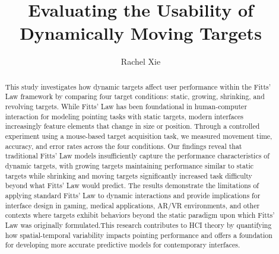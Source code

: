 \documentclass[acmlarge]{acmart}
\begin{document}
\title{Evaluating the Usability of Dynamically Moving Targets}

\author{Rachel Xie}
\authornotemark[1]

\renewcommand{\shortauthors}{Trovato et al.}

\begin{abstract}
 This study investigates how dynamic targets affect user performance within the Fitts' Law framework by comparing four target conditions: static, growing, shrinking, and revolving targets. While Fitts' Law has been foundational in human-computer interaction for modeling pointing tasks with static targets, modern interfaces increasingly feature elements that change in size or position. Through a controlled experiment using a mouse-based target acquisition task, we measured movement time, accuracy, and error rates across the four conditions. Our findings reveal that traditional Fitts' Law models insufficiently capture the performance characteristics of dynamic targets, with growing targets maintaining performance similar to static targets while shrinking and moving targets significantly increased task difficulty beyond what Fitts' Law would predict. The results demonstrate the limitations of applying standard Fitts' Law to dynamic interactions and provide implications for interface design in gaming, medical applications, AR/VR environments, and other contexts where targets exhibit behaviors beyond the static paradigm upon which Fitts' Law was originally formulated.This research contributes to HCI theory by quantifying how spatial-temporal variability impacts pointing performance and offers a foundation for developing more accurate predictive models for contemporary interfaces.
\end{abstract}
\end{document}
